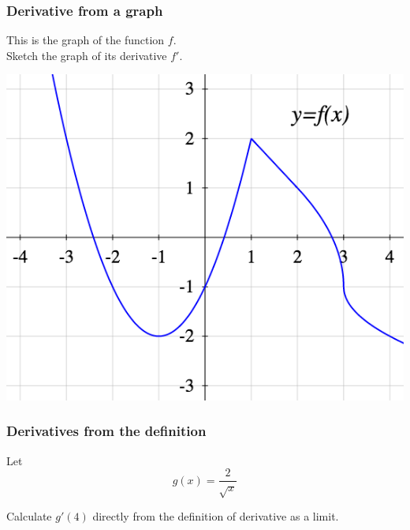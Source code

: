\documentclass[14pt]{beamer}
\newcommand {\DS} [1] {${\displaystyle #1}$}
\begin{document}
\begin{frame}[t]
\frametitle{Derivative from a graph}
This is the graph of the function $f$.  \\
Sketch the graph of its derivative $f'$.
\begin{center}
\includegraphics[scale=.4]{G4}
\end{center}

\end{frame}
\begin{frame}[t]
\frametitle{Derivatives from the definition}

Let 
	$$g(x) = \frac{2}{\sqrt{x}} $$
	
Calculate \DS{g'(4)} directly from the definition of derivative as a limit.

\end{frame}

\end{document}
